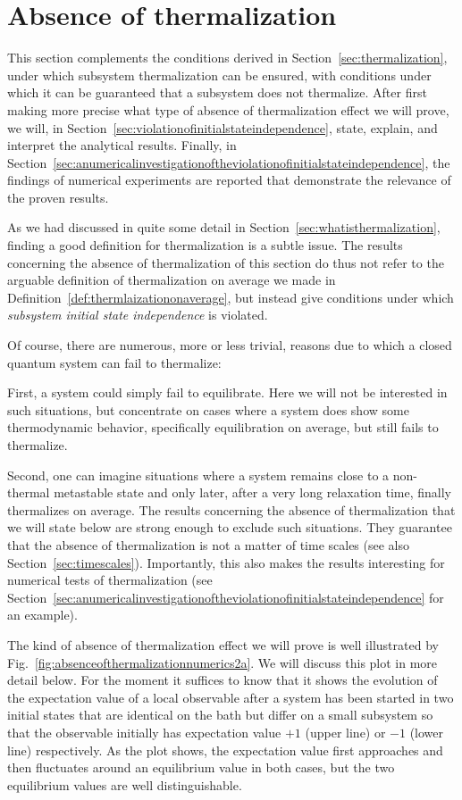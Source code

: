 \documentclass[a4paper,12pt,listof=totoc,index=totoc,bibliography=totoc,headsepline=false,headings=normal,BCOR16.153846mm,DIV12,headinclude,twoside,cleardoublepage=empty,numbers=noenddot,final]{scrreprt}
\theoremstyle{mystyle}
\numberwithin{equation}{section}
\numberwithin{figure}{section}
\numberwithin{lemma}{section}
\numberwithin{theorem}{section}
\numberwithin{corollary}{section}
\numberwithin{definition}{section}
\numberwithin{conjecture}{section}
\numberwithin{observation}{section}
\newcommand{\+}{\mkern2mu}
\DeclareMathOperator{\1}{\mathds{1}}
\begin{document}
\section{Absence of thermalization}
\label{sec:absenceofthermalization}
%
This section complements the conditions derived in Section~\ref{sec:thermalization}, under which subsystem thermalization can be ensured, with conditions under which it can be guaranteed that a subsystem does not thermalize.
After first making more precise what type of absence of thermalization effect we will prove, we will, in Section~\ref{sec:violationofinitialstateindependence}, state, explain, and interpret the analytical results.
Finally, in Section~\ref{sec:anumericalinvestigationoftheviolationofinitialstateindependence}, the findings of numerical experiments are reported that demonstrate the relevance of the proven results.

As we had discussed in quite some detail in Section~\ref{sec:whatisthermalization}, finding a good definition for thermalization is a subtle issue.
The results concerning the absence of thermalization of this section do thus not refer to the arguable definition of thermalization on average we made in Definition~\ref{def:thermlaizationonaverage}, but instead give conditions under which \emph{subsystem initial state independence} is violated.

Of course, there are numerous, more or less trivial, reasons due to which a closed quantum system can fail to thermalize:

First, a system could simply fail to equilibrate.
Here we will not be interested in such situations, but concentrate on cases where a system does show some thermodynamic behavior, specifically equilibration on average, but still fails to thermalize.

Second, one can imagine situations where a system remains close to a non-thermal metastable state and only later, after a very long relaxation time, finally thermalizes on average.
The results concerning the absence of thermalization that we will state below are strong enough to exclude such situations.
They guarantee that the absence of thermalization is not a matter of time scales (see also Section~\ref{sec:timescales}).
Importantly, this also makes the results interesting for numerical tests of thermalization (see Section~\ref{sec:anumericalinvestigationoftheviolationofinitialstateindependence} for an example).

The kind of absence of thermalization effect we will prove is well illustrated by Fig.~\ref{fig:absenceofthermalizationnumerics2a}.
We will discuss this plot in more detail below.
For the moment it suffices to know that it shows the evolution of the expectation value of a local observable after a system has been started in two initial states that are identical on the bath but differ on a small subsystem so that the observable initially has expectation value $+1$ (upper line) or $-1$ (lower line) respectively.
As the plot shows, the expectation value first approaches and then fluctuates around an equilibrium value in both cases, but the two equilibrium values are well distinguishable.
\end{document}
